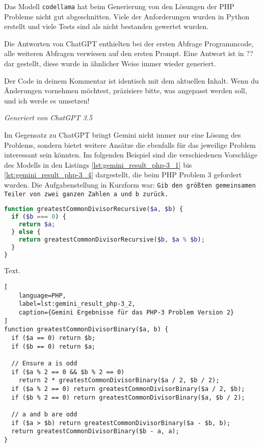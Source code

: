 Das Modell \texttt{codellama} hat beim Generierung von den Lösungen der PHP Probleme nicht gut abgeschnitten. Viele der Anforderungen wurden in Python erstellt und viele Tests sind als nicht bestanden gewertet wurden.\vspace{0.2cm}

Die Antworten von ChatGPT enthielten bei der ersten Abfrage Programmcode, alle weiteren Abfragen verwiesen auf den ersten Prompt. Eine Antwort ist in ?? dar gestellt, diese wurde in ähnlicher Weise immer wieder generiert.

\hrulefill

Der Code in deinem Kommentar ist identisch mit dem aktuellen Inhalt. Wenn du Än\-der\-ungen vornehmen möchtest, präzisiere bitte, was angepasst werden soll, und ich werde es umsetzen!
\begin{flushright}
	\textit{Generiert von ChatGPT 3.5}
\end{flushright}
\hrulefill

Im Gegensatz zu ChatGPT bringt Gemini nicht immer nur eine Lösung des Problems, sondern bietet weitere Ansätze die ebenfalls für das jeweilige Problem interessant sein könnten. Im folgenden Beispiel sind die verschiedenen Vorschläge des Modells in den Listings \ref{lst:gemini_result_php-3_1} bis \ref{lst:gemini_result_php-3_4} dargestellt, die beim PHP Problem 3 gefordert wurden. Die Aufgabenstellung in Kurzform war: \texttt{Gib den größten gemeinsamen Teiler von zwei ganzen Zahlen a und b zurück.}

\begin{lstlisting}[language=PHP,label=lst:gemini_result_php-3_1,caption={Gemini Ergebnis für das PHP-3 Problem Version 1}]
function greatestCommonDivisorRecursive($a, $b) {
  if ($b === 0) {
    return $a;
  } else {
    return greatestCommonDivisorRecursive($b, $a % $b);
  }
}
\end{lstlisting}

Text.

\begin{lstlisting}[
	language=PHP,
	label=lst:gemini_result_php-3_2,
	caption={Gemini Ergebnisse für das PHP-3 Problem Version 2}
]
function greatestCommonDivisorBinary($a, b) {
  if ($a == 0) return $b;
  if ($b == 0) return $a;

  // Ensure a is odd
  if ($a % 2 == 0 && $b % 2 == 0)
    return 2 * greatestCommonDivisorBinary($a / 2, $b / 2);
  if ($a % 2 == 0) return greatestCommonDivisorBinary($a / 2, $b);
  if ($b % 2 == 0) return greatestCommonDivisorBinary($a, $b / 2);

  // a and b are odd
  if ($a > $b) return greatestCommonDivisorBinary($a - $b, b);
  return greatestCommonDivisorBinary($b - a, a);
}
\end{lstlisting}

